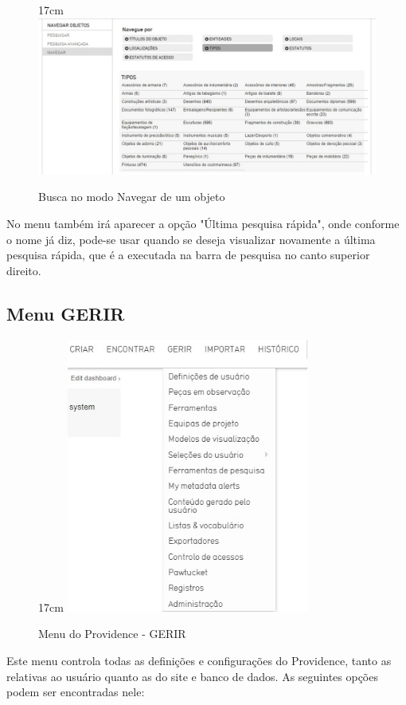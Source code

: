 \documentclass[a4paper,12pt,oneside,onecolumn,final,fleqn]{repUERJ}
\begin{document}
\begin{figure}[!ht]{17cm}
	\includegraphics[width=15cm, center]{figuras/navegar_obj.jpg}
	\caption{Busca no modo Navegar de um objeto} \label{fig:navegar_obj}
\end{figure}

No menu também irá aparecer a opção "Última pesquisa rápida", onde conforme o nome já diz, pode-se usar quando se deseja visualizar novamente a última pesquisa rápida, que é a executada na barra de pesquisa no canto superior direito.

\subsection{Menu GERIR}

\begin{figure}[!ht]{17cm}
	\includegraphics[width=8cm, center]{figuras/menu_gerir.jpg}
	\caption{Menu do Providence - GERIR} \label{fig:menu_gerir}
\end{figure}

Este menu controla todas as definições e configurações do Providence, tanto as relativas ao usuário quanto as do site e banco de dados. As seguintes opções podem ser encontradas  nele:
\end{document}

